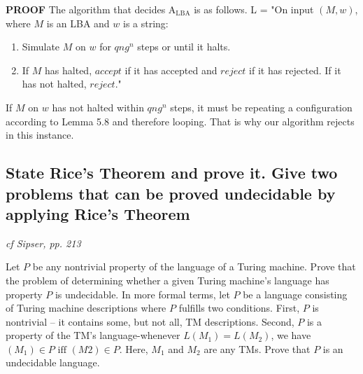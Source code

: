 \documentclass[main.tex]{subfiles}
\begin{document}
\par\textbf{PROOF}
The algorithm that decides $\text{A}_\text{LBA}$ is as follows.
L = "On input $(M, w)$, where $M$ is an LBA and $w$ is a string:
\begin{enumerate}
    \item Simulate $M$ on $w$ for $qng^n$ steps or until it halts.
    \item If $M$ has halted, $accept$ if it has accepted and $reject$ if it has
rejected. If it has not halted, $reject$."
\end{enumerate}{}

If $M$ on $w$ has not halted within $qng^n$ steps, it must be repeating a configuration according to Lemma 5.8 and therefore looping. That is why our algorithm
rejects in this instance.

\subsection{State Rice’s Theorem and prove it. Give two problems that can be proved
undecidable by applying Rice’s Theorem}

\emph{cf Sipser, pp. 213}
\begin{mytheo*}{}
Let $P$ be any nontrivial property of the language of a Turing
machine. Prove that the problem of determining whether a given Turing machine's
language has property $P$ is undecidable.
In more formal terms, let $P$ be a language consisting of Turing machine descriptions where $P$ fulfills two conditions. First, $P$ is nontrivial -- it contains some, but
not all, TM descriptions. Second, $P$ is a property of the TM's language-whenever
$L(M_1) = L(M_2)$, we have $(M_1) \in P \text{ iff } (M2) \in P$. Here, $M_1$ and $M_2$ are any TMs. Prove that $P$ is an undecidable language.
\end{mytheo*}
\end{document}
